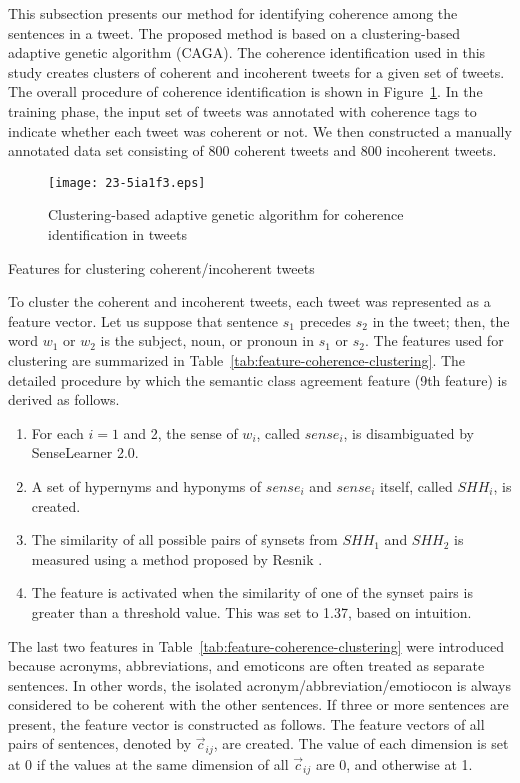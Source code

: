 \documentclass[english]{jnlp_1.4}
\begin{document}
This subsection presents our method for identifying coherence among the sentences in a tweet.
The proposed method is based on a clustering-based adaptive genetic algorithm (CAGA).
The coherence identification used in this study creates clusters of coherent and incoherent tweets for a given set of tweets.
The overall procedure of coherence identification is shown in Figure~\ref{Clustering_genetic_algorithm}.
In the training phase, the input set of tweets was annotated with coherence tags to indicate whether each tweet was coherent or not.
We then constructed a manually annotated data set consisting of 800 coherent tweets and 800 incoherent tweets.

\begin{figure}[b]
\begin{center}
\texttt{[image: 23-5ia1f3.eps]}
\end{center}
\caption{Clustering-based adaptive genetic algorithm for coherence identification in tweets}
\label{Clustering_genetic_algorithm}
\end{figure}

\begin{table}[b]
\caption{Features for clustering coherent/incoherent tweets}
\label{tab:feature-coherence-clustering}

\end{table}

To cluster the coherent and incoherent tweets, each tweet was represented as a feature vector.
Let us suppose that sentence $s_{1}$ precedes $s_{2}$ in the tweet; then, the word $w_1$ or $w_2$ is the subject, noun, or pronoun in $s_1$ or $s_2$.
The features used for clustering are summarized in Table~\ref{tab:feature-coherence-clustering}.
The detailed procedure by which the semantic class agreement feature (9th feature) is derived as follows.
	\begin{enumerate}
		\item For each $i=1$ and 2, the sense of $w_{i}$, called $sense_i$, is disambiguated by SenseLearner 2.0.
                \item A set of hypernyms and hyponyms of $sense_i$ and $sense_i$ itself, called $SHH_i$, is created.
		\item The similarity of all possible pairs of synsets from $SHH_1$ and $SHH_2$ is measured using a method proposed by Resnik \cite{Resnik_1995}.
		\item The feature is activated when the similarity of one of the synset pairs is greater than a threshold value. This was set to 1.37, based on intuition.
	\end{enumerate}
The last two features in Table~\ref{tab:feature-coherence-clustering} were introduced because acronyms, abbreviations, and emoticons are often treated as separate sentences.
In other words, the isolated acronym/abbreviation/{\linebreak}emotiocon is always considered to be coherent with the other sentences.
If three or more sentences are present, the feature vector is constructed as follows.
The feature vectors of all pairs of sentences, denoted by $\vec{c}_{ij}$, are created.
The value of each dimension is set at 0 if the values at the same dimension of all $\vec{c}_{ij}$ are 0, and otherwise at 1.
\end{document}
